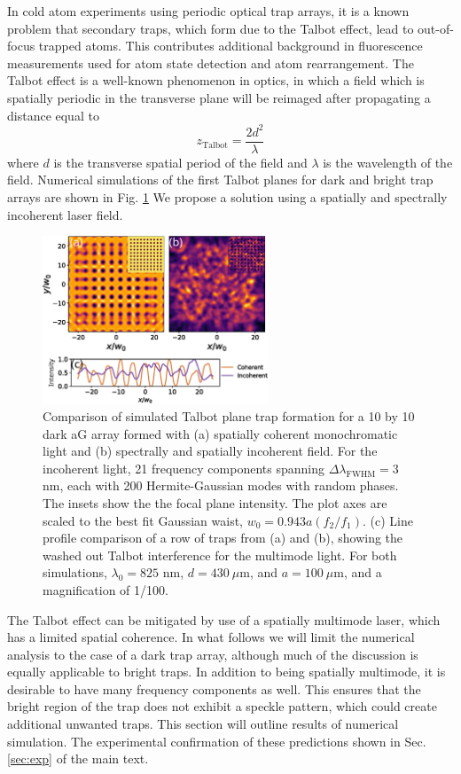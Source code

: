 In cold atom experiments using periodic optical trap arrays, it is a known problem that secondary traps, which form due to the Talbot effect, lead to out-of-focus trapped atoms. This contributes additional background in fluorescence measurements used for atom state detection and atom rearrangement\cite{graham2019}. The Talbot effect is a well-known phenomenon in optics, in which a field which is spatially periodic in the transverse plane will be reimaged after propagating a distance equal to 
\begin{equation*}
    z_{\text{Talbot}} = \frac{2d^2}{\lambda}
\end{equation*}
where $d$ is the transverse spatial period of the field and $\lambda$ is the wavelength of the field. Numerical simulations of the first Talbot planes for dark and bright trap arrays are shown in Fig. \ref{fig:talbotcompare} We propose a solution using a spatially and spectrally incoherent laser field. 
\begin{figure}[!th]
    \centering
    \includegraphics[width=0.6\textwidth]{Images/figure7.eps}
    \caption{Comparison of simulated Talbot plane trap formation for a 10 by 10 dark aG array formed with (a) spatially coherent monochromatic light and (b) spectrally and spatially incoherent field. For the incoherent light, 21 frequency components spanning $\Delta \lambda_{\text{FWHM}} = 3$ nm, each with 200 Hermite-Gaussian modes with random phases. The insets show the the focal plane intensity. The plot axes are scaled to the best fit Gaussian waist, $w_0=0.943 a(f_2/f_1)$. (c) Line profile comparison of a row of traps from (a) and (b), showing the washed out Talbot interference for the multimode light. For both simulations, $\lambda_0=825$ nm, $d=430~\mu$m, and $a=100~\mu$m, and a magnification of 1/100.}
    \label{fig:talbotcompare}
\end{figure}

The Talbot effect can be mitigated by use of a spatially multimode laser, which has a limited spatial coherence. In what follows we will limit the numerical analysis to the case of a dark trap array, although much of the discussion is equally applicable to bright traps. In addition to being spatially multimode, it is desirable to have many frequency components as well. This ensures that the bright region of the trap does not exhibit a speckle pattern, which could create additional unwanted traps. This section will outline results of numerical simulation. The experimental confirmation of these predictions shown in Sec. \ref{sec:exp} of the main text. 

